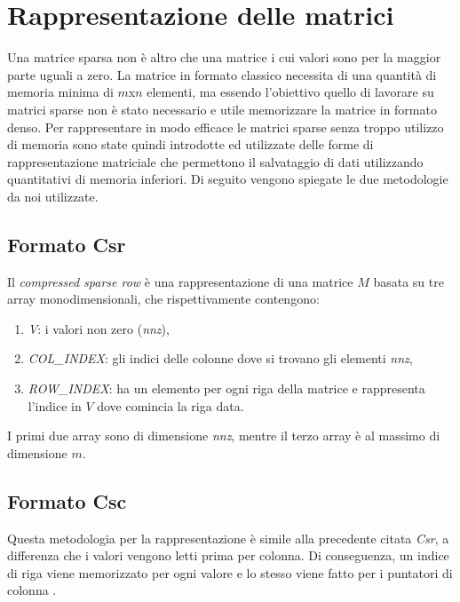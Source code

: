 \documentclass[]{IEEEtran}
\begin{document}
\section{Rappresentazione delle matrici}
\label{rappresentazione}
	Una matrice sparsa non è altro che una matrice i cui valori sono per la maggior parte uguali a zero. La matrice in formato classico necessita di una quantità di memoria minima di $ m $x$ n $ elementi, ma essendo l'obiettivo quello di lavorare su matrici sparse non è stato necessario e utile memorizzare la matrice in formato denso.\newline
	Per rappresentare in modo efficace le matrici sparse senza troppo utilizzo di memoria sono state quindi introdotte ed utilizzate delle forme di rappresentazione matriciale che permettono il salvataggio di dati utilizzando quantitativi di memoria inferiori.\newline
	Di seguito vengono spiegate le due metodologie da noi utilizzate.
	
	\subsection{Formato Csr}
	\label{csr}
	Il \textit{compressed sparse row} è una rappresentazione di una matrice $ M $ basata su tre array monodimensionali, che rispettivamente contengono:
	\begin{enumerate}
		\item \textit{V}: i valori non zero (\textit{nnz}),
		\item \textit{COL\_INDEX}: gli indici delle colonne dove si trovano gli elementi \textit{nnz},
		\item \textit{ROW\_INDEX}: ha un elemento per ogni riga della matrice e rappresenta l'indice in $ V $ dove comincia la riga data.
	\end{enumerate}
	I primi due array sono di dimensione \textit{nnz}, mentre il terzo array è al massimo di dimensione $ m $.
	
	\subsection{Formato Csc}
	\label{csc}
 	Questa metodologia per la rappresentazione è simile alla precedente citata \textit{Csr}, a differenza che i valori vengono letti prima per colonna. Di conseguenza, un indice di riga viene memorizzato per ogni valore e lo stesso viene fatto per i puntatori di colonna .
 	
\end{document}
